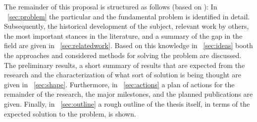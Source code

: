 The remainder of this proposal is structured as follows (based on \cite{Lauer:1975gf}): In
\sectionname~\ref{sec:problem} the particular and the fundamental problem is
identified in detail. Subsequently, the historical development of the subject,
relevant work by others, the most important stances in the literature, and a
summary of the gap in the field are given in
\sectionname~\ref{sec:relatedwork}. Based on this knowledge in \sectionname~\ref{sec:ideas} booth the
approaches and considered methods for solving the problem are discussed. The
preliminary results, a short summary of results that are expected from the
research and the characterization of what sort of solution is being thought are
given in \sectionname~\ref{sec:shape}. Furthermore, in
\sectionname~\ref{sec:actions} a plan of actions for the remainder of the
research, the major milestones, and the planned publications are given. Finally,
in \sectionname~\ref{sec:outline} a rough outline of the thesis itself, in
terms of the expected solution to the problem, is shown.




